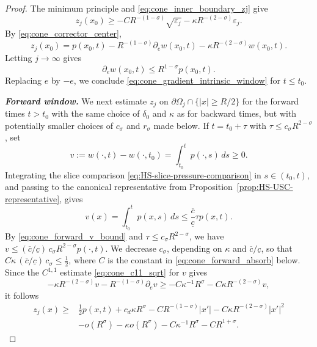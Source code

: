 \documentclass[11pt]{amsart}
\numberwithin{equation}{section}
\numberwithin{figure}{section}
\theoremstyle{plain}
\theoremstyle{definition}
\theoremstyle{remark}
\theoremstyle{plain}
\begin{document}
\begin{proof}
The minimum principle and \eqref{eq:cone_inner_boundary_zj} give
\[
    z_j(x_0)\geq
    -CR^{-(1-\sigma)}\sqrt{\varepsilon_j}
    -\kappa R^{-(2-\sigma)}\varepsilon_j.
\]
By \eqref{eq:cone_corrector_center},
\[
    z_j(x_0)=p(x_0,t)-R^{-(1-\sigma)}\partial_e w(x_0,t)
    -\kappa R^{-(2-\sigma)}w(x_0,t).
\]
Letting \(j\to\infty\) gives
\[
    \partial_e w(x_0,t)\leq R^{1-\sigma}p(x_0,t).
\]
Replacing \(e\) by \(-e\), we conclude \eqref{eq:cone_gradient_intrinsic_window} for $t\leq t_0$.


\textbf{\emph{Forward window.}}
We next estimate $z_j$ on $\partial\Omega_j \cap \{|x|\geq R/2\}$ for the forward times $t>t_0$ with the same choice of $\delta_0$ and $\kappa$ as for backward times, but with potentially smaller choices of \(c_\sigma\) and
\(r_\sigma\) made below. 
If \(t=t_0+\tau\) with
\(\tau\leq c_\sigma R^{2-\sigma}\), set
\[
    v:=w(\cdot,t)-w(\cdot,t_0)=\int_{t_0}^t p(\cdot,s)\,ds\geq0.
\]
Integrating the slice comparison
\eqref{eq:HS-slice-pressure-comparison} in \(s\in(t_0,t)\), and passing to the
canonical representative from Proposition~\ref{prop:HS-USC-representative}, gives
\begin{equation}\label{eq:cone_forward_v_bound}
    v(x)=\int_{t_0}^t p(x,s)\,ds
    \leq \frac{\overline c}{\underline c}\tau p(x,t).
\end{equation}
By \eqref{eq:cone_forward_v_bound} and \(\tau\leq c_\sigma R^{2-\sigma}\), we have
\(v\leq(\overline c/\underline c)\,c_\sigma R^{2-\sigma}p(\cdot,t)\). We decrease
\(c_\sigma\), depending on \(\kappa\) and \(\overline c/\underline c\), so that
\(C\kappa\,(\overline c/\underline c)\,c_\sigma\leq\tfrac12\), where \(C\) is the constant
in \eqref{eq:cone_forward_absorb} below.
Since the \(C^{1,1}\) estimate \eqref{eq:cone_c11_sqrt} for \(v\) gives
\begin{equation}\label{eq:cone_forward_absorb}
    -\kappa R^{-(2-\sigma)}v-R^{-(1-\sigma)}\partial_ev
    \geq
    -C\kappa^{-1}R^\sigma-C\kappa R^{-(2-\sigma)}v,
\end{equation}
it follows 
\begin{equation}\label{eq:cone_forward_outer_common}
    \begin{aligned}
    z_j(x)\geq{}&\frac12p(x,t)+c_d\kappa R^\sigma
    -CR^{-(1-\sigma)}|x'|
    -C\kappa R^{-(2-\sigma)}|x'|^2\\
    &-o(R^\sigma)-\kappa o(R^\sigma)
    -C\kappa^{-1}R^\sigma-CR^{1+\sigma}.
    \end{aligned}
\end{equation}


\end{proof}
\end{document}

